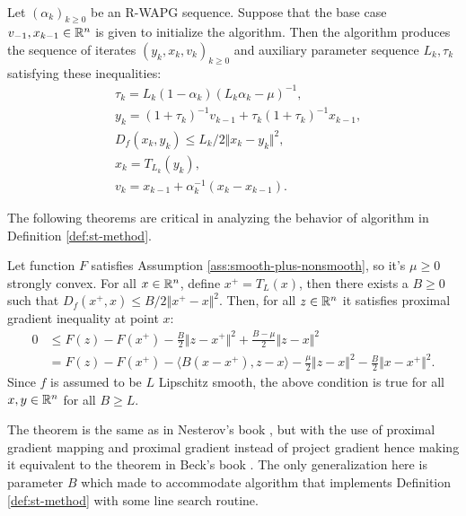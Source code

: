 \documentclass[12pt]{article}
\begin{document}
        \begin{definition}\;\label{def:st-method}\\
            Let $(\alpha_k)_{k \ge 0}$ be an R-WAPG sequence. 
            Suppose that the base case $v_{-1}, x_{k - 1}\in \mathbb R^n$ is given to initialize the algorithm. 
            Then the algorithm produces the sequence of iterates $(y_k, x_k, v_k)_{k \ge 0}$ and auxiliary parameter sequence $L_k, \tau_k$ satisfying these inequalities: 
            \begin{align*}
                & \tau_k = L_k(1 - \alpha_k)(L_k\alpha_k - \mu)^{-1}, 
                \\
                & y_k = (1 + \tau_k)^{-1} v_{k - 1} + \tau_k (1 + \tau_k)^{-1} x_{k - 1},
                \\
                & D_f(x_k, y_k) \le L_k/2\Vert x_k - y_k\Vert^2, 
                \\
                & x_k = T_{L_k}(y_k),
                \\
                & v_k = x_{k - 1} + \alpha_k^{-1}(x_k - x_{k - 1}). 
            \end{align*} 
        \end{definition}
        The following theorems are critical in analyzing the behavior of algorithm in Definition \ref{def:st-method}. 
        \begin{theorem}\label{thm:pg-ineq}
            Let function $F$ satisfies Assumption \ref{ass:smooth-plus-nonsmooth}, so it's $\mu \ge 0$ strongly convex. 
            For all $x\in \mathbb R^n$, define $x^+ = T_L(x)$, then there exists a $B \ge 0$ such that $D_f(x^+, x) \le B/2 \Vert x^+ - x\Vert^2$. 
            Then, for all $z \in \mathbb R^n$ it satisfies proximal gradient inequality at point $x$:  
            \begin{align*}
                0&\le F(z) - F(x^+) - \frac{B}{2}\Vert z - x^+\Vert^2  + \frac{B - \mu}{2}\Vert z - x\Vert^2
                \\
                &=  F(z) - F(x^+) - \langle B(x - x^+), z - x\rangle
                - \frac{\mu}{2}\Vert z - x\Vert^2
                - \frac{B}{2}\Vert x - x^+\Vert^2. 
            \end{align*}
            Since $f$ is assumed to be $L$ Lipschitz smooth, the above condition is true for all $x, y \in \mathbb R^n$ for all $B \ge L$. 
        \end{theorem}
        \begin{remark}
            The theorem is the same as in Nesterov's book \cite[Theorem 2.2.13]{nesterov_lectures_2018}, but with the use of proximal gradient mapping and proximal gradient instead of project gradient hence making it equivalent to the theorem in Beck's book \cite[Theorem 10.16]{beck_first-order_2017}. 
            The only generalization here is parameter $B$ which made to accommodate algorithm that implements Definition \ref{def:st-method} with some line search routine. 
        \end{remark}
\end{document}
